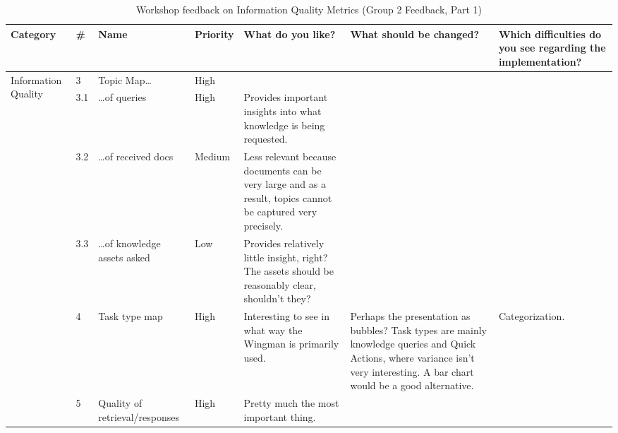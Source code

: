 \documentclass[
	english,
	ruledheaders=section,%
	class=report,%
	thesis={type=bachelor},%
	accentcolor=1b,%
	custommargins=true,%
	marginpar=false,%
	parskip=half-,%
	fontsize=11pt,%
	DIV=14,
]{tudapub}
\begin{document}
\begin{table}
    \centering
    \small 
    \caption{Workshop feedback on Information Quality Metrics (Group 2 Feedback, Part 1)}
    \label{tab:info_quality_g2_p1}
    \begin{tabularx}{\textheight}{p{2.2cm} l >{\RaggedRight\arraybackslash}X l >{\RaggedRight\arraybackslash}X >{\RaggedRight\arraybackslash}X >{\RaggedRight\arraybackslash}X}
        \toprule
        \textbf{Category} & \textbf{\#} & \textbf{Name} & \textbf{Priority} & \textbf{What do you like?} & \textbf{What should be changed?} & \textbf{Which difficulties do you see regarding the implementation?} \\
        \midrule

        \multirow{6}{=}{Information Quality} 
        & 3 & Topic Map\dots & High & & & \\
        \cmidrule(l){2-7}
        & 3.1 & \dots of queries & High & Provides important insights into what knowledge is being requested. & & \\
        \cmidrule(l){2-7}
        & 3.2 & \dots of received docs & Medium & Less relevant because documents can be very large and as a result, topics cannot be captured very precisely. & & \\
        \cmidrule(l){2-7}
        & 3.3 & \dots of knowledge assets asked & Low & Provides relatively little insight, right? The assets should be reasonably clear, shouldn't they? & & \\
        \cmidrule(l){2-7}
        & 4 & Task type map & High & Interesting to see in what way the Wingman is primarily used. & Perhaps the presentation as bubbles? Task types are mainly knowledge queries and Quick Actions, where variance isn't very interesting. A bar chart would be a good alternative. & Categorization. \\
        \cmidrule(l){2-7}
        & 5 & Quality of retrieval/responses & High & Pretty much the most important thing. & & \\
        \bottomrule
    \end{tabularx}
\end{table}
\end{document}
